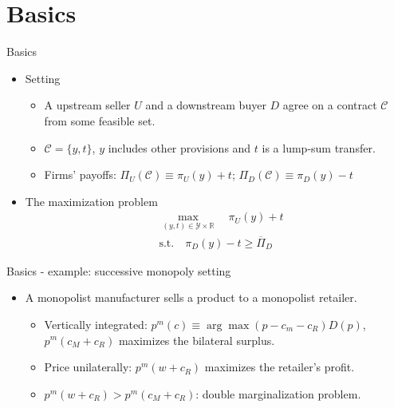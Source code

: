\documentclass[aspectratio=169]{beamer}  %
\begin{document}
\section{Basics}
\begin{frame}{Basics}
    \begin{itemize}
        \item Setting \vspace{.2cm}
        \begin{itemize}
            \item A upstream seller $U$ and a downstream buyer $D$ agree on a contract $\mathcal{C}$ from some feasible set. \vspace{.2cm}
            \item $\mathcal{C} = \{y, t\}$, $y$ includes other provisions and $t$ is a lump-sum transfer. \vspace{.2cm}
            \item Firms' payoffs: $\Pi_U(\mathcal{C})\equiv \pi_U(y) + t$; $\Pi_D(\mathcal{C})\equiv \pi_D(y) - t$ \vspace{.2cm}
        \end{itemize}
        \item The maximization problem \vspace{.2cm}
        \begin{equation}
            \begin{aligned}
            & \max_{(y, t) \in \mathcal{Y} \times \mathbb{R}} \quad \pi_U(y) + t \\
            & \text{s.t.} \quad \pi_D(y) - t \geq \overline{\Pi}_D
            \end{aligned}
            \end{equation}
    \end{itemize}
\end{frame}



\begin{frame}{Basics - example: successive monopoly setting}
    \begin{itemize}
        \item A monopolist manufacturer sells a product to a monopolist retailer. \vspace{.2cm}
        \begin{itemize}
            \item Vertically integrated: $p^m(c)\equiv \arg\max (p-c_m-c_R)D(p)$, $p^m(c_M+c_R)$ maximizes the bilateral surplus. \vspace{.2cm}
            \item Price unilaterally: $p^m(w+c_R)$ maximizes the retailer's profit. \vspace{.2cm}
            \item $p^m(w+c_R) > p^m(c_M+c_R)$: double marginalization problem. \vspace{.2cm} 
        \end{itemize} 
    \end{itemize}
\end{frame}
\end{document}
